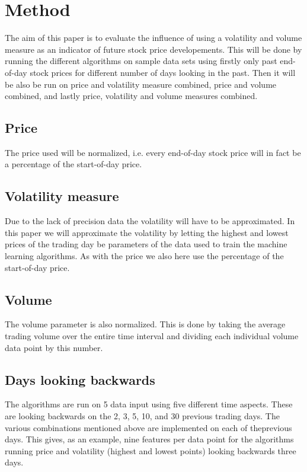 \documentclass{article}
\begin{document}
\newpage

\section{Method}
The aim of this paper is to evaluate the influence of using a volatility and volume measure as an indicator of future stock price developements. This will be done by running the different algorithms on sample data sets using firstly only past end-of-day stock prices for different number of days looking in the past. Then it will be also be run on price and volatility measure combined, price and volume combined, and lastly price, volatility and volume measures combined. 

\subsection{Price}
The price used will be normalized, i.e. every end-of-day stock price will in fact be a percentage of the start-of-day price.

\subsection{Volatility measure}
Due to the lack of precision data the volatility will have to be approximated. In this paper we will approximate the volatility by letting the highest and lowest prices of the trading day be parameters of the data used to train the machine learning algorithms. As with the price we also here use the percentage of the start-of-day price.

\subsection{Volume}
The volume parameter is also normalized. This is done by taking the average trading volume over the entire time interval and dividing each individual volume data point by this number. 

\subsection{Days looking backwards}
The algorithms are run on 5 data input using five different time aspects. These are looking backwards on the 2, 3, 5, 10, and 30 previous trading days. The various combinations mentioned above are implemented on each of theprevious days. This gives, as an example, nine features per data point for the algorithms running price and volatility (highest and lowest points) looking backwards three days.
\end{document}
